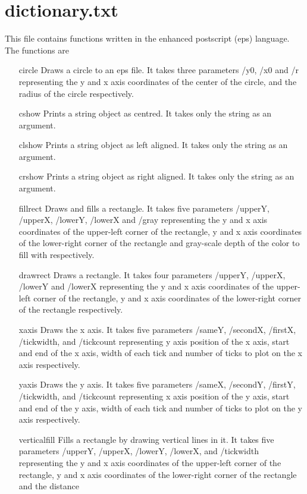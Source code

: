 \documentclass[a4paper,12pt]{book}
\begin{document}
\section{dictionary.txt}
This file contains functions written in the enhanced postscript (eps) language. The functions are
\begin{itemize}
\item[circle] Draws a circle to an eps file. It takes three parameters /y0, /x0 and /r representing the y and x axis coordinates of the center of the circle, and the radius of the circle respectively.
\item[cshow] Prints a string object as centred. It takes only the string as an argument.
\item[clshow] Prints a string object as left aligned. It takes only the string as an argument.
\item[crshow] Prints a string object as right aligned. It takes only the string as an argument.
\item[fillrect] Draws and fills a rectangle. It takes five parameters /upperY, /upperX, /lowerY, /lowerX and /gray representing the y and x axis coordinates of the upper-left corner of the rectangle, y and x axis coordinates of the lower-right corner of the rectangle and gray-scale depth of the color to fill with respectively.
\item[drawrect] Draws a rectangle. It takes four parameters /upperY, /upperX, /lowerY and /lowerX  representing the y and x axis coordinates of the upper-left corner of the rectangle, y and x axis coordinates of the lower-right corner of the rectangle respectively.
\item[xaxis] Draws the x axis. It takes five parameters /sameY, /secondX, /firstX, /tickwidth, and /tickcount representing y axis position of the x axis, start and end of the x axis, width of each tick and number of ticks to plot on the x axis respectively.
\item[yaxis] Draws the y axis. It takes five parameters /sameX, /secondY, /firstY, /tickwidth, and /tickcount representing x axis position of the y axis, start and end of the y axis, width of each tick and number of ticks to plot on the y axis respectively.
\item[verticalfill] Fills a rectangle by drawing vertical lines in it. It takes five parameters /upperY, /upperX, /lowerY, /lowerX, and /tickwidth representing the y and x axis coordinates of the upper-left corner of the rectangle, y and x axis coordinates of the lower-right corner of the rectangle and the distance

\end{itemize}
\end{document}
